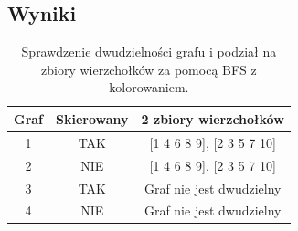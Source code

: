 \documentclass{article}
\begin{document}
\subsection{Wyniki}
\begin{table}[H]
\begin{adjustbox}{center}
\begin{tabular}{|c|c|c|}
    \hline
    Graf & Skierowany & 2 zbiory wierzchołków\\
    \hline
    1 & TAK & [1 4 6 8 9], [2 3 5 7 10]\\
    \hline
    2 & NIE & [1 4 6 8 9], [2 3 5 7 10]\\
    \hline
    3 & TAK & Graf nie jest dwudzielny\\
    \hline
    4 & NIE & Graf nie jest dwudzielny\\
    \hline
\end{tabular}
\end{adjustbox}
\caption{Sprawdzenie dwudzielności grafu i podział na zbiory wierzchołków za pomocą BFS z kolorowaniem.}
\end{table}
\end{document}
